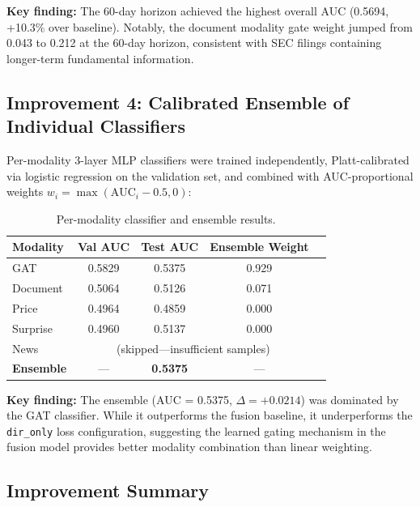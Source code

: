 \documentclass[12pt,a4paper]{article}
\begin{document}
\noindent\textbf{Key finding:} The 60-day horizon achieved the highest overall AUC (0.5694, +10.3\% over baseline). Notably, the document modality gate weight jumped from 0.043 to 0.212 at the 60-day horizon, consistent with SEC filings containing longer-term fundamental information.

\subsection{Improvement 4: Calibrated Ensemble of Individual Classifiers}

Per-modality 3-layer MLP classifiers were trained independently, Platt-calibrated via logistic regression on the validation set, and combined with AUC-proportional weights $w_i = \max(\text{AUC}_i - 0.5, 0)$:

\begin{table}[H]
\centering
\caption{Per-modality classifier and ensemble results.}
\begin{tabular}{lcccc}
\toprule
\textbf{Modality} & \textbf{Val AUC} & \textbf{Test AUC} & \textbf{Ensemble Weight} \\
\midrule
GAT       & 0.5829 & 0.5375 & 0.929 \\
Document  & 0.5064 & 0.5126 & 0.071 \\
Price     & 0.4964 & 0.4859 & 0.000 \\
Surprise  & 0.4960 & 0.5137 & 0.000 \\
News      & \multicolumn{3}{c}{(skipped---insufficient samples)} \\
\midrule
\textbf{Ensemble} & --- & \textbf{0.5375} & --- \\
\bottomrule
\end{tabular}
\end{table}

\noindent\textbf{Key finding:} The ensemble (AUC = 0.5375, $\Delta = +0.0214$) was dominated by the GAT classifier. While it outperforms the fusion baseline, it underperforms the \texttt{dir\_only} loss configuration, suggesting the learned gating mechanism in the fusion model provides better modality combination than linear weighting.

\subsection{Improvement Summary}
\end{document}
